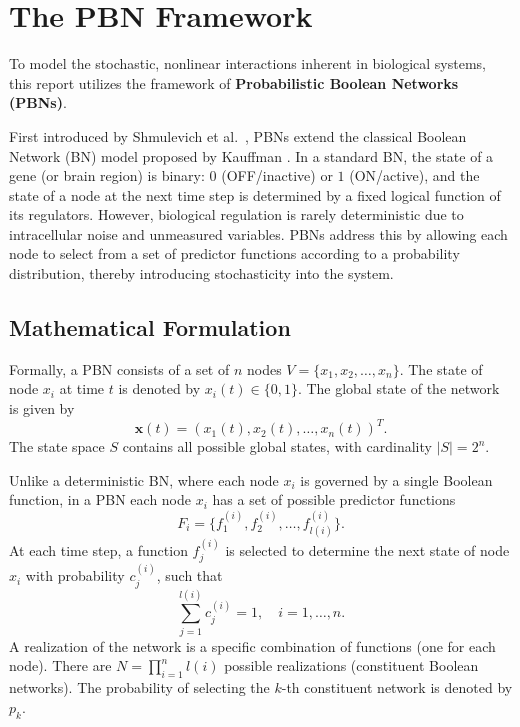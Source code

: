\documentclass[12pt, a4paper]{report}
\begin{document}
\section{The PBN Framework}

To model the stochastic, nonlinear interactions inherent in biological systems, this report utilizes the framework of \textbf{Probabilistic Boolean Networks (PBNs)}.

First introduced by Shmulevich et al.~\cite{shmulevich2002probabilistic}, PBNs extend the classical Boolean Network (BN) model proposed by Kauffman \cite{kauffman1969metabolic}. In a standard BN, the state of a gene (or brain region) is binary: $0$ (OFF/inactive) or $1$ (ON/active), and the state of a node at the next time step is determined by a fixed logical function of its regulators. However, biological regulation is rarely deterministic due to intracellular noise and unmeasured variables. PBNs address this by allowing each node to select from a set of predictor functions according to a probability distribution, thereby introducing stochasticity into the system.

\subsection{Mathematical Formulation}
Formally, a PBN consists of a set of $n$ nodes $V = \{x_1, x_2, \dots, x_n\}$. The state of node $x_i$ at time $t$ is denoted by $x_i(t) \in \{0, 1\}$. The global state of the network is given by
\begin{equation}
	\mathbf{x}(t) = (x_1(t), x_2(t), \dots, x_n(t))^T.
\end{equation}
The state space $S$ contains all possible global states, with cardinality $|S| = 2^n$.

Unlike a deterministic BN, where each node $x_i$ is governed by a single Boolean function, in a PBN each node $x_i$ has a set of possible predictor functions
\[
F_i = \{f_1^{(i)}, f_2^{(i)}, \dots, f_{l(i)}^{(i)}\}.
\]
At each time step, a function $f_j^{(i)}$ is selected to determine the next state of node $x_i$ with probability $c_j^{(i)}$, such that
\begin{equation}
	\sum_{j=1}^{l(i)} c_j^{(i)} = 1, \quad i = 1, \dots, n.
\end{equation}
A realization of the network is a specific combination of functions (one for each node). There are $N = \prod_{i=1}^n l(i)$ possible realizations (constituent Boolean networks). The probability of selecting the $k$-th constituent network is denoted by $p_k$.
\end{document}
